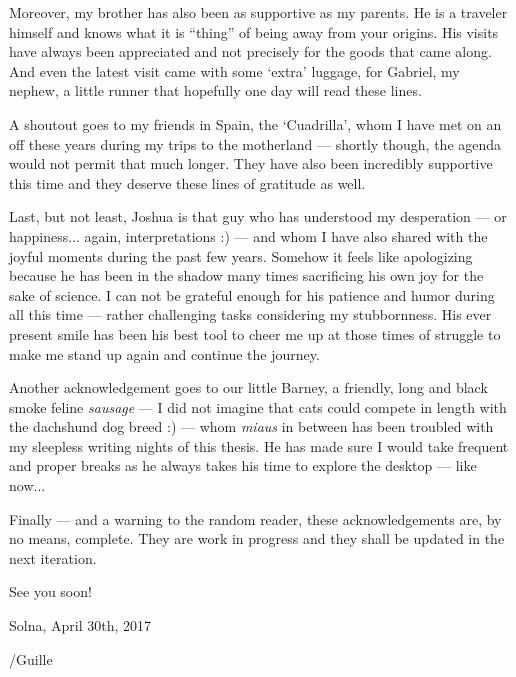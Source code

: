 Moreover, my brother has also been as supportive as my parents. He is a traveler 
himself and knows what it is ``thing'' of being away from your origins. His visits 
have always been appreciated and not precisely for the goods that came along. And 
even the latest visit came with some `extra' luggage, for Gabriel, my nephew, a 
little runner that hopefully one day will read these lines.

A shoutout goes to my friends in Spain, the `Cuadrilla', whom I have met on an off 
these years during my trips to the motherland --- shortly though, the agenda would 
not permit that much longer. They have also been incredibly supportive this time 
and they deserve these lines of gratitude as well.

Last, but not least, Joshua is that guy who has understood my desperation --- or happiness... 
again, interpretations :) --- and whom I have also shared with the joyful moments 
during the past few years. Somehow it feels like apologizing because he has been 
in the shadow many times sacrificing his own joy for the sake of science. I can 
not be grateful enough for his patience and humor during all this time --- rather 
challenging tasks considering my stubbornness. His ever present smile has been his 
best tool to cheer me up at those times of struggle to make me stand up again and 
continue the journey.

Another acknowledgement goes to our little Barney, a friendly, long and black 
smoke feline \emph{sausage} --- I did not imagine that cats could compete in length 
with the dachshund dog breed :) --- whom \emph{miaus} in between has been troubled 
with my sleepless writing nights of this thesis. He has made sure I would take frequent 
and proper breaks as he always takes his time to explore the desktop --- like now...

Finally --- and a warning to the random reader, these acknowledgements are, by no 
means, complete. They are work in progress and they shall be updated in the next 
iteration.

See you soon!

\vspace{1.5em}

\hfill\begin{minipage}[t]{0.33\textwidth}
        \begin{center}
            Solna, April 30th, 2017
            
            \vspace{0.75em}
            
            /Guille
        \end{center}
\end{minipage}

